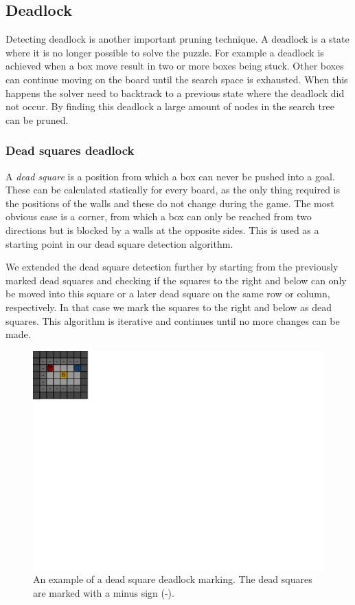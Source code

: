 \documentclass[a4paper,11pt]{article}
\renewcommand{\*}[0]{\cdot}
\begin{document}
\subsection{Deadlock}

Detecting deadlock is another important pruning technique. A deadlock is a
state where it is no longer possible to solve the puzzle. For example a deadlock
is achieved when a box move result in two or more boxes being stuck. Other boxes
can continue moving on the board until the search space is exhausted. When this
happens the solver need to backtrack to a previous state where the deadlock did
not occur. By finding this deadlock a large amount of nodes in the search tree
can be pruned.

\subsubsection{Dead squares deadlock}

A \emph{dead square} is a position from which a box can never be pushed into a
goal. These can be calculated statically for every board, as the only thing
required is the positions of the walls and these do not change during the game.
The most obvious case is a corner, from which a box can only be reached from two
directions but is blocked by a walls at the opposite sides. This is used as a
starting point in our dead square detection algorithm.

We extended the dead square detection further by starting from the previously
marked dead squares and checking if the squares to the right and below can only
be moved into this square or a later dead square on the same row or column,
respectively. In that case we mark the squares to the right and below as dead
squares. This algorithm is iterative and continues until no more changes can
be made.

\begin{figure}[h!]
    \begin{center}
        \includegraphics{figures/deadSquareDeadlock}
    \end{center}
    \caption{An example of a dead square deadlock marking. The dead squares are
    marked with a minus sign (-).}
    \label{fig:deadSquareDeadlock}
\end{figure}
\end{document}
